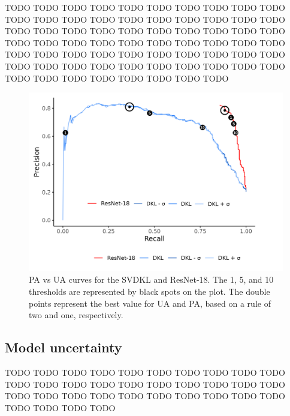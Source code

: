 \documentclass[a4paper, nobind]{templates/cdethesis}
\begin{document}
TODO TODO TODO TODO TODO TODO TODO TODO TODO TODO TODO TODO TODO TODO TODO TODO TODO TODO TODO TODO TODO TODO TODO TODO TODO TODO TODO TODO TODO TODO TODO TODO TODO TODO
TODO TODO TODO TODO TODO TODO TODO TODO TODO TODO TODO TODO TODO TODO TODO TODO TODO TODO TODO TODO TODO TODO TODO TODO TODO TODO TODO TODO TODO TODO TODO TODO TODO TODO

\begin{figure}[!h]
    \centering
    \includegraphics[width=0.8\linewidth]{figures/chapter02/figure06.png}
    \caption{PA vs UA curves for the SVDKL and ResNet-18. The 1, 5, and 10 thresholds are represented by black spots on the plot. The double points represent the best value for UA and PA, based on a rule of two and one, respectively.}
    \label{fig:figurexy02}
\end{figure}

\subsection{Model uncertainty}

TODO TODO TODO TODO TODO TODO TODO TODO TODO TODO TODO TODO TODO TODO TODO TODO TODO TODO TODO TODO TODO TODO TODO TODO TODO TODO TODO TODO TODO TODO TODO TODO TODO TODO
\end{document}
